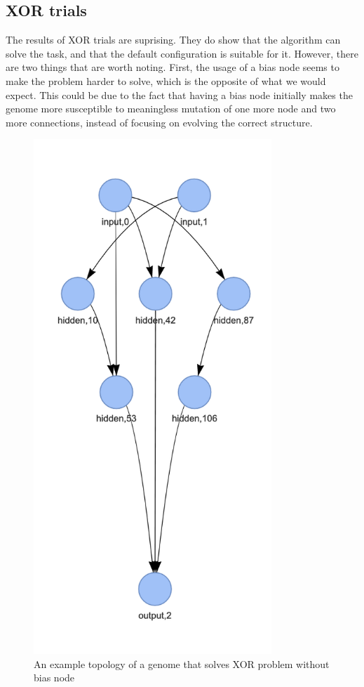 \documentclass{article}
\begin{document}
\subsection{XOR trials}
    The results of XOR trials are suprising. They do show that the algorithm can solve the task, and that the default configuration is suitable for it.
    However, there are two things that are worth noting. First, the usage of a bias node seems to make the problem harder to solve, 
    which is the opposite of what we would expect. This could be due to the fact that having a bias node initially 
    makes the genome more susceptible to meaningless mutation of one more node and two more connections,
    instead of focusing on evolving the correct structure.
    \begin{figure}
        \centering
        \includegraphics[width=0.8\textwidth]{xor_topology_example.png}
        \caption{An example topology of a genome that solves XOR problem without bias node }
        \label{fig:xor_bias}
    \end{figure}
\end{document}
